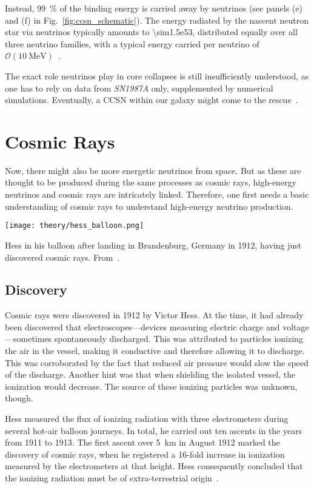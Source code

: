 Instead, \SI{99}{\percent} of the binding energy is carried away by neutrinos (see panels (e) and (f) in Fig.~\ref{fig:ccsn_schematic}). The energy radiated by the nascent neutron star via neutrinos typically amounts to \SI{\sim1.5e53}{\erg}, distributed equally over all three neutrino families, with a typical energy carried per neutrino of $\mathcal{O}(\SI{10}{\mega\eV})$~.

The exact role neutrinos play in core collapses is still insufficiently understood, as one has to rely on data from \emph{SN1987A} only, supplemented by numerical simulations. Eventually, a CCSN within our galaxy might come to the rescue~.

\section{Cosmic Rays}\label{cosmic_rays}

Now, there might also be more energetic neutrinos from space. But as these are thought to be produced during the same processes as cosmic rays, high-energy neutrinos and cosmic rays are intricately linked. Therefore, one first needs a basic understanding of cosmic rays to understand high-energy neutrino production.

\begin{marginfigure}
    \texttt{[image: theory/hess\_balloon.png]}
    \caption[Hess in his balloon]{Hess in his balloon after landing in Brandenburg, Germany in 1912, having just discovered cosmic rays. From~\cite{Steinmaurer1985}.}
\end{marginfigure}

\subsection{Discovery}

Cosmic rays were discovered in 1912 by Victor Hess. At the time, it had already been discovered that electroscopes---devices measuring electric charge and voltage---sometimes spontaneously discharged. This was attributed to particles ionizing the air in the vessel, making it conductive and therefore allowing it to discharge. This was corroborated by the fact that reduced air pressure would slow the speed of the discharge. Another hint was that when shielding the isolated vessel, the ionization would decrease. The source of these ionizing particles was unknown, though.

Hess measured the flux of ionizing radiation with three electrometers during several hot-air balloon journeys. In total, he carried out ten ascents in the years from 1911 to 1913. The first ascent over \SI{5}{\km} in August 1912 marked the discovery of cosmic rays, when he registered a 16-fold increase in ionization measured by the electrometers at that height. Hess consequently concluded that the ionizing radiation must be of extra-terrestrial origin~.


